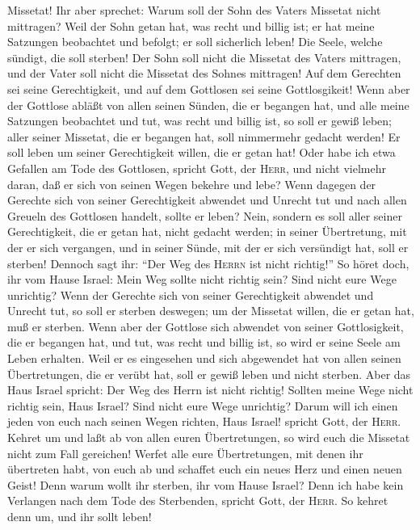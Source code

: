 Missetat!  Ihr aber sprechet: Warum soll der Sohn des
Vaters Missetat nicht mittragen? Weil der Sohn getan hat, was recht und
billig ist; er hat meine Satzungen beobachtet und befolgt; er soll
sicherlich leben!  Die Seele, welche sündigt, die soll
sterben! Der Sohn soll nicht die Missetat des Vaters mittragen, und der
Vater soll nicht die Missetat des Sohnes mittragen! Auf dem Gerechten
sei seine Gerechtigkeit, und auf dem Gottlosen sei seine Gottlosgikeit!
 Wenn aber der Gottlose abläßt von allen seinen Sünden,
die er begangen hat, und alle meine Satzungen beobachtet und tut, was
recht und billig ist, so soll er gewiß leben;  aller
seiner Missetat, die er begangen hat, soll nimmermehr gedacht werden! Er
soll leben um seiner Gerechtigkeit willen, die er getan hat!
 Oder habe ich etwa Gefallen am Tode des Gottlosen,
spricht Gott, der \textsc{Herr}, und nicht vielmehr daran, daß er sich
von seinen Wegen bekehre und lebe?  Wenn dagegen der
Gerechte sich von seiner Gerechtigkeit abwendet und Unrecht tut und nach
allen Greueln des Gottlosen handelt, sollte er leben? Nein, sondern es
soll aller seiner Gerechtigkeit, die er getan hat, nicht gedacht werden;
in seiner Übertretung, mit der er sich vergangen, und in seiner Sünde,
mit der er sich versündigt hat, soll er sterben!  Dennoch
sagt ihr: ``Der Weg des \textsc{Herrn} ist nicht richtig!'' So höret
doch, ihr vom Hause Israel: Mein Weg sollte nicht richtig sein? Sind
nicht eure Wege unrichtig?  Wenn der Gerechte sich von
seiner Gerechtigkeit abwendet und Unrecht tut, so soll er sterben
deswegen; um der Missetat willen, die er getan hat, muß er sterben.
 Wenn aber der Gottlose sich abwendet von seiner
Gottlosigkeit, die er begangen hat, und tut, was recht und billig ist,
so wird er seine Seele am Leben erhalten.  Weil er es
eingesehen und sich abgewendet hat von allen seinen Übertretungen, die
er verübt hat, soll er gewiß leben und nicht sterben. 
Aber das Haus Israel spricht: Der Weg des Herrn ist nicht richtig!
Sollten meine Wege nicht richtig sein, Haus Israel?  Sind
nicht eure Wege unrichtig? Darum will ich einen jeden von euch nach
seinen Wegen richten, Haus Israel! spricht Gott, der \textsc{Herr}.
Kehret um und laßt ab von allen euren Übertretungen, so wird euch die
Missetat nicht zum Fall gereichen!  Werfet alle eure
Übertretungen, mit denen ihr übertreten habt, von euch ab und schaffet
euch ein neues Herz und einen neuen Geist! Denn warum wollt ihr sterben,
ihr vom Hause Israel?  Denn ich habe kein Verlangen nach
dem Tode des Sterbenden, spricht Gott, der \textsc{Herr}. So kehret denn
um, und ihr sollt leben!

